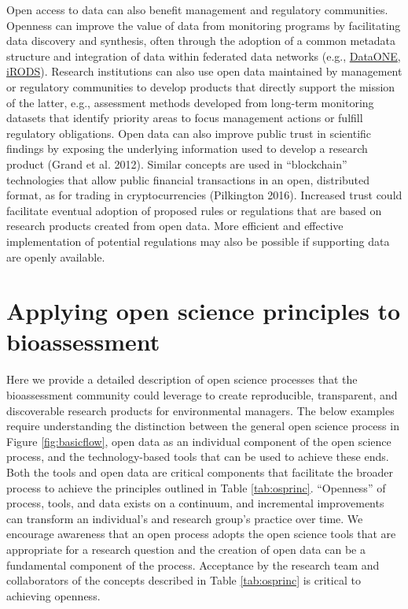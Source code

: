 \documentclass[fleqn,10pt,lineno]{wlpeerj} %
\begin{document}
Open access to data can also benefit management and regulatory communities. Openness can improve the value of data from monitoring programs by facilitating data discovery and synthesis, often through the adoption of a common metadata structure and integration of data within federated data networks (e.g., \href{https://www.dataone.org/}{DataONE}, \href{https://irods.org/}{iRODS}). Research institutions can also use open data maintained by management or regulatory communities to develop products that directly support the mission of the latter, e.g., assessment methods developed from long-term monitoring datasets that identify priority areas to focus management actions or fulfill regulatory obligations. Open data can also improve public trust in scientific findings by exposing the underlying information used to develop a research product (Grand et al. 2012). Similar concepts are used in ``blockchain'' technologies that allow public financial transactions in an open, distributed format, as for trading in cryptocurrencies (Pilkington 2016). Increased trust could facilitate eventual adoption of proposed rules or regulations that are based on research products created from open data. More efficient and effective implementation of potential regulations may also be possible if supporting data are openly available.

\hypertarget{applying-open-science-principles-to-bioassessment}{%
\section{Applying open science principles to bioassessment}\label{applying-open-science-principles-to-bioassessment}}

Here we provide a detailed description of open science processes that the bioassessment community could leverage to create reproducible, transparent, and discoverable research products for environmental managers. The below examples require understanding the distinction between the general open science process in Figure \ref{fig:basicflow}, open data as an individual component of the open science process, and the technology-based tools that can be used to achieve these ends. Both the tools and open data are critical components that facilitate the broader process to achieve the principles outlined in Table \ref{tab:osprinc}. ``Openness'' of process, tools, and data exists on a continuum, and incremental improvements can transform an individual's and research group's practice over time. We encourage awareness that an open process adopts the open science tools that are appropriate for a research question and the creation of open data can be a fundamental component of the process. Acceptance by the research team and collaborators of the concepts described in Table \ref{tab:osprinc} is critical to achieving openness.
\end{document}
